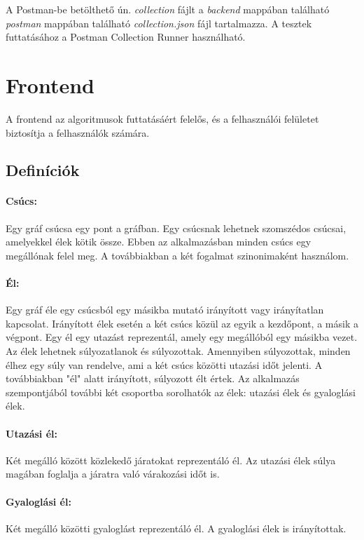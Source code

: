 A Postman-be betölthető ún. \textit{collection} fájlt a \textit{backend} mappában található \textit{postman} mappában található \textit{collection.json} fájl tartalmazza. A tesztek futtatásához a Postman Collection Runner használható.

\section{Frontend}

A frontend az algoritmusok futtatásáért felelős, és a felhasználói felületet biztosítja a felhasználók számára.

\subsection{Definíciók}

\paragraph{Csúcs:} Egy gráf csúcsa egy pont a gráfban. Egy csúcsnak lehetnek szomszédos csúcsai, amelyekkel élek kötik össze. Ebben az alkalmazásban minden csúcs egy megállónak felel meg. A továbbiakban a két fogalmat szinonimaként használom.

\paragraph{Él:} Egy gráf éle egy csúcsból egy másikba mutató irányított vagy irányítatlan kapcsolat. Irányított élek esetén a két csúcs közül az egyik a kezdőpont, a másik a végpont. Egy él egy utazást reprezentál, amely egy megállóból egy másikba vezet. Az élek lehetnek súlyozatlanok és súlyozottak. Amennyiben súlyozottak, minden élhez egy súly van rendelve, ami a két csúcs közötti utazási időt jelenti. A továbbiakban "él" alatt irányított, súlyozott élt értek. Az alkalmazás szempontjából további két csoportba sorolhatók az élek: utazási élek és gyaloglási élek.

\paragraph{Utazási él:} Két megálló között közlekedő járatokat reprezentáló él. Az utazási élek súlya magában foglalja a járatra való várakozási időt is.

\paragraph{Gyaloglási él:} Két megálló közötti gyaloglást reprezentáló él. A gyaloglási élek is irányítottak.

